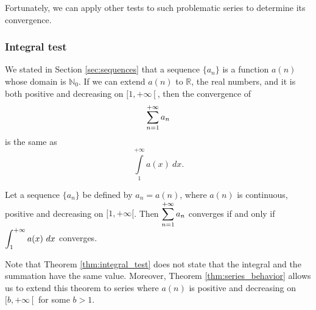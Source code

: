 Fortunately, we can apply other tests to such problematic series to determine its convergence.


\subsubsection{Integral test}
We stated in Section \ref{sec:sequences} that a sequence $\{a_n\}$ is a function $a(n)$ whose domain is $\mathbb{N}_0$. If we can extend $a(n)$ to $\mathbb{R}$, the real numbers, and it is both positive and decreasing on $[1,+\infty\left[\right.$, then the convergence of 
$$\displaystyle \sum_{n=1}^{+\infty} a_n$$
 is the same as 
$$\displaystyle\int\limits_1^{+\infty} a(x)\ dx.$$ 

\begin{theorem}\label{thm:integral_test}
Let a sequence $\{a_n\}$ be defined by $a_n=a(n)$, where $a(n)$ is continuous, positive and decreasing on $[1,+\infty[$. Then $\displaystyle \sum_{n=1}^{+\infty} a_n$ converges if and only if $\displaystyle\int_1^{+\infty} a(x)\ dx$ converges.
\end{theorem}

Note that Theorem \ref{thm:integral_test} does not state that the integral and the summation have the same value. Moreover, Theorem \ref{thm:series_behavior} allows us to extend this theorem to series where $a(n)$ is positive and decreasing on $[b,+\infty\left[\right.$ for some $b>1$.

\ifanalysis

